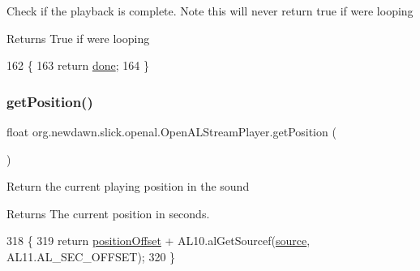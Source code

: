 Check if the playback is complete. Note this will never return true if we\textquotesingle{}re looping

\begin{DoxyReturn}{Returns}
True if we\textquotesingle{}re looping 
\end{DoxyReturn}

\begin{DoxyCode}
162                           \{
163         \textcolor{keywordflow}{return} \mbox{\hyperlink{classorg_1_1newdawn_1_1slick_1_1openal_1_1_open_a_l_stream_player_a64962f56b4c366c19fe3c2bff2f55842}{done}};
164     \}
\end{DoxyCode}
\mbox{\label{classorg_1_1newdawn_1_1slick_1_1openal_1_1_open_a_l_stream_player_a9abaf98266809fa03b92f42744a3d332}} 
\subsubsection{\texorpdfstring{get\+Position()}{getPosition()}}
{\footnotesize\ttfamily float org.\+newdawn.\+slick.\+openal.\+Open\+A\+L\+Stream\+Player.\+get\+Position (\begin{DoxyParamCaption}{ }\end{DoxyParamCaption})\hspace{0.3cm}{\ttfamily [inline]}}

Return the current playing position in the sound

\begin{DoxyReturn}{Returns}
The current position in seconds. 
\end{DoxyReturn}

\begin{DoxyCode}
318                                \{
319         \textcolor{keywordflow}{return} \mbox{\hyperlink{classorg_1_1newdawn_1_1slick_1_1openal_1_1_open_a_l_stream_player_a41556aeb2058a1c2dd04177e1d61d43c}{positionOffset}} + AL10.alGetSourcef(\mbox{\hyperlink{classorg_1_1newdawn_1_1slick_1_1openal_1_1_open_a_l_stream_player_abe9f7d1ac52a705aa359cf3eb1c69464}{source}}, AL11.AL\_SEC\_OFFSET);
320     \}
\end{DoxyCode}
\mbox{\label{classorg_1_1newdawn_1_1slick_1_1openal_1_1_open_a_l_stream_player_ac995066157d65c9191cbdb7ef2c0d2f4}} 
